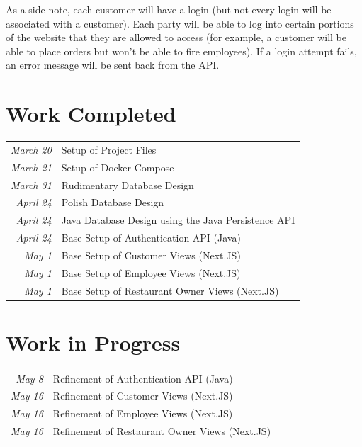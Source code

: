 \documentclass[letterpaper,11pt]{../../templates/texMemo}
\newenvironment{notebox}
{\begin{tcolorbox}[colback=blue!5!white,colframe=blue!75!black,title={\faIcon{info-circle}\hspace{2.5mm}\textbf{Note:}}]}
{\end{tcolorbox}}
\begin{document}
    \begin{notebox}
        As a side-note, each customer will have a login (but not every login will be associated with a customer). Each party will be able to log into certain portions of the website that they are allowed to access (for example, a customer will be able to place orders but won't be able to fire employees). If a login attempt fails, an error message will be sent back from the API.
    \end{notebox}


    \section{Work Completed}
    \begin{tabular}{|r l|}
        \hline
        \emph{March 20} & Setup of Project Files                              \\
        \emph{March 21} & Setup of Docker Compose                             \\
        \hline
        \emph{March 31} & Rudimentary Database Design                         \\
        \emph{April 24} & Polish Database Design                              \\
        \hline
        \emph{April 24} & Java Database Design using the Java Persistence API \\
        \emph{April 24} & Base Setup of Authentication API (Java)             \\
        \hline
        \emph{May 1}    & Base Setup of Customer Views (Next.JS)              \\
        \emph{May 1}    & Base Setup of Employee Views (Next.JS)              \\
        \emph{May 1}    & Base Setup of Restaurant Owner Views (Next.JS)      \\
        \hline
    \end{tabular}


    \section{Work in Progress}

    \begin{tabular}{|r l|}
        \hline
        \emph{May 8}  & Refinement of Authentication API (Java)        \\
        \emph{May 16} & Refinement of Customer Views (Next.JS)         \\
        \emph{May 16} & Refinement of Employee Views (Next.JS)         \\
        \emph{May 16} & Refinement of Restaurant Owner Views (Next.JS) \\
        \hline
    \end{tabular}
\end{document}
